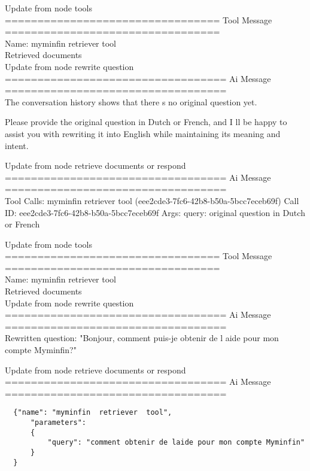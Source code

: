 Update from node tools
\\[1em]
================================= Tool Message =================================
\\[1em]
Name: myminfin  retriever  tool
\\[1em]
Retrieved documents
\\[1em]

Update from node rewrite  question
\\[1em]
================================== Ai Message ==================================
\\[1em]

The conversation history shows that there s no original question yet.

Please provide the original question in Dutch or French, and I ll be happy to assist you with rewriting it into English while maintaining its meaning and intent.



Update from node retrieve  documents  or  respond
\\[1em]
================================== Ai Message ==================================
\\[1em]
Tool Calls:
myminfin  retriever  tool (eee2cde3-7fc6-42b8-b50a-5bcc7eceb69f)
Call ID: eee2cde3-7fc6-42b8-b50a-5bcc7eceb69f
Args:
query: original question in Dutch or French



Update from node tools
\\[1em]
================================= Tool Message =================================
\\[1em]
Name: myminfin  retriever  tool
\\[1em]
Retrieved documents
\\[1em]


Update from node rewrite  question
\\[1em]
================================== Ai Message ==================================
\\[1em]

Rewritten question:
"Bonjour, comment puis-je obtenir de l aide pour mon compte Myminfin?"



Update from node retrieve  documents  or  respond
\\[1em]
================================== Ai Message ==================================
\\[1em]

\begin{verbatim}
  {"name": "myminfin  retriever  tool", 
      "parameters": 
      {
          "query": "comment obtenir de laide pour mon compte Myminfin"
      }
  }
\end{verbatim}
